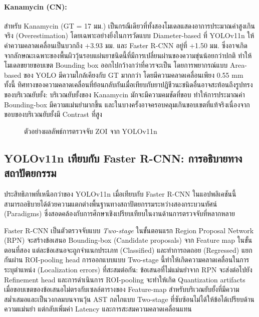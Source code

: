 \paragraph{Kanamycin (CN):}
สำหรับ Kanamycin (GT = 17 มม.) เป็นกรณีเดียวที่ทั้งสองโมเดลแสดงอาการประมาณค่าสูงเกินจริง (Overestimation) โดยเฉพาะอย่างยิ่งในการวัดแบบ Diameter-based ที่ YOLOv11n ให้ค่าความคลาดเคลื่อนเป็นบวกถึง $+$3.93 มม. และ Faster R-CNN อยู่ที่ $+$1.50 มม. ซึ่งอาจเกิดจากลักษณะเฉพาะของพื้นผิววุ้นรอบแผ่นยาชนิดนี้ที่มีการเปลี่ยนผ่านของความขุ่นน้อยกว่าปกติ ทำให้โมเดลขยายขอบเขต Bounding box ออกไปกว้างกว่าที่ควรจะเป็น โดยการพยากรณ์แบบ Area-based ของ YOLO มีความใกล้เคียงกับ GT มากกว่า โดยมีความคลาดเคลื่อนเพียง 0.55 mm ทั้งนี้ ทิศทางของความคลาดเคลื่อนที่ย้อนกลับกันเมื่อเทียบกับยาปฏิชีวนะชนิดอื่นอาจสะท้อนถึงรูปทรงของบริเวณยับยั้ง: บริเวณยับยั้งของ Kanamycin มักจะมีความคมชัดที่ขอบ ทำให้การประมาณค่า Bounding-box มีความแม่นยำมากขึ้น และในบางครั้งอาจครอบคลุมเกินขอบเขตที่แท้จริงเนื่องจากขอบของบริเวณยับยั้งมี Contrast ที่สูง

\begin{figure}[H]
  \centering
  \caption{ตัวอย่างผลลัพธ์การตรวจจับ ZOI จาก YOLOv11n}
  \label{fig:detection_result}
\end{figure}

\subsection{YOLOv11n เทียบกับ Faster R-CNN: การอธิบายทางสถาปัตยกรรม}

ประสิทธิภาพที่เหนือกว่าของ YOLOv11n เมื่อเทียบกับ Faster R-CNN ในแอปพลิเคชันนี้
สามารถอธิบายได้ด้วยความแตกต่างพื้นฐานทางสถาปัตยกรรมระหว่างสองกระบวนทัศน์ (Paradigms)
ซึ่งสอดคล้องกับการศึกษาเชิงเปรียบเทียบในงานด้านการตรวจจับที่หลากหลาย \cite{sharma2024yolo_comparison}

Faster R-CNN \cite{ren2015faster} เป็นตัวตรวจจับแบบ \emph{Two-stage}
ในขั้นตอนแรก Region Proposal Network (RPN) จะสร้างข้อเสนอ Bounding-box (Candidate proposals) จาก Feature map
ในขั้นตอนที่สอง แต่ละข้อเสนอจะถูกจำแนกประเภท (Classified) และทำการถดถอย (Regressed) แยกกันผ่าน ROI-pooling head
การออกแบบแบบ Two-stage นี้ทำให้เกิดความคลาดเคลื่อนในการระบุตำแหน่ง (Localization errors) ที่สะสมต่อกัน:
ข้อเสนอที่ไม่แม่นยำจาก RPN จะส่งต่อไปยัง Refinement head
และการดำเนินการ ROI-pooling จะทำให้เกิด Quantization artifacts เมื่อขอบเขตของข้อเสนอไม่ตรงกับเซลล์ตารางของ Feature-map
สำหรับบริเวณยับยั้งที่มีความสม่ำเสมอและเป็นวงกลมบนจานวุ้น AST กลไกแบบ Two-stage ที่ซับซ้อนไม่ได้ให้ข้อได้เปรียบด้านความแม่นยำ
แต่กลับเพิ่มค่า Latency และการสะสมความคลาดเคลื่อนแทน


